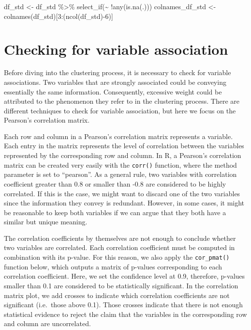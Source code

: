 \documentclass[
  letterpaper,
  DIV=11,
  numbers=noendperiod]{scrreprt}
\newenvironment{Shaded}{\begin{snugshade}}{\end{snugshade}}
\newcommand{\DecValTok}[1]{\textcolor[rgb]{0.68,0.00,0.00}{#1}}
\newcommand{\FunctionTok}[1]{\textcolor[rgb]{0.28,0.35,0.67}{#1}}
\newcommand{\NormalTok}[1]{\textcolor[rgb]{0.00,0.23,0.31}{#1}}
\newcommand{\OtherTok}[1]{\textcolor[rgb]{0.00,0.23,0.31}{#1}}
\newcommand{\SpecialCharTok}[1]{\textcolor[rgb]{0.37,0.37,0.37}{#1}}
\begin{document}
\begin{Shaded}
\begin{Highlighting}[]
\NormalTok{df\_std }\OtherTok{\textless{}{-}}\NormalTok{ df\_std }\SpecialCharTok{\%\textgreater{}\%} \FunctionTok{select\_if}\NormalTok{(}\SpecialCharTok{\textasciitilde{}} \SpecialCharTok{!}\FunctionTok{any}\NormalTok{(}\FunctionTok{is.na}\NormalTok{(.)))}
\NormalTok{colnames\_df\_std }\OtherTok{\textless{}{-}} \FunctionTok{colnames}\NormalTok{(df\_std)[}\DecValTok{3}\SpecialCharTok{:}\NormalTok{(}\FunctionTok{ncol}\NormalTok{(df\_std)}\SpecialCharTok{{-}}\DecValTok{6}\NormalTok{)]}
\end{Highlighting}
\end{Shaded}

\hypertarget{sec-sec35}{%
\section{Checking for variable association}\label{sec-sec35}}

Before diving into the clustering process, it is necessary to check for
variable associations. Two variables that are strongly associated could
be conveying essentially the same information. Consequently, excessive
weight could be attributed to the phenomenon they refer to in the
clustering process. There are different techniques to check for variable
association, but here we focus on the Pearson's correlation matrix.

Each row and column in a Pearson's correlation matrix represents a
variable. Each entry in the matrix represents the level of correlation
between the variables represented by the corresponding row and column.
In R, a Pearson's correlation matrix can be created very easily with the
\texttt{corr()} function, where the method parameter is set to
``pearson''. As a general rule, two variables with correlation
coefficient greater than 0.8 or smaller than -0.8 are considered to be
highly correlated. If this is the case, we might want to discard one of
the two variables since the information they convey is redundant.
However, in some cases, it might be reasonable to keep both variables if
we can argue that they both have a similar but unique meaning.

The correlation coefficients by themselves are not enough to conclude
whether two variables are correlated. Each correlation coefficient must
be computed in combination with its p-value. For this reason, we also
apply the \texttt{cor\_pmat()} function below, which outputs a matrix of
p-values corresponding to each correlation coefficient. Here, we set the
confidence level at 0.9, therefore, p-values smaller than 0.1 are
considered to be statistically significant. In the correlation matrix
plot, we add crosses to indicate which correlation coefficients are not
significant (i.e.~those above 0.1). Those crosses indicate that there is
not enough statistical evidence to reject the claim that the variables
in the corresponding row and column are uncorrelated.
\end{document}
